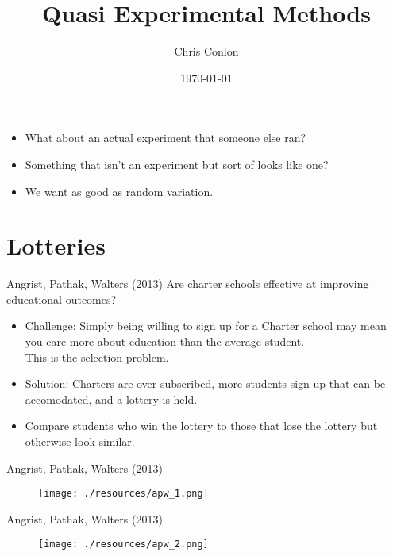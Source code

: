 

\title{Quasi Experimental Methods}
\author{Chris Conlon}
\date{\today}

\frame{\titlepage}


\begin{frame}{}
\begin{itemize}
\item What about an actual experiment that someone else ran?
\item Something that isn’t an experiment but sort of looks like one?
\item We want \alert{as good as random} variation.
\end{itemize}
\end{frame}
\section{Lotteries}

\begin{frame}{Angrist, Pathak, Walters (2013)}
Are charter schools effective at improving educational outcomes?
\begin{itemize}
    \item Challenge: Simply being willing to sign up for a Charter school may mean you care more about education than the average student.\\
    This is the \alert{selection problem}.
    \item Solution: Charters are over-subscribed, more students sign up that can be accomodated, and a lottery is held.
    \item Compare students who win the lottery to those that lose the lottery but otherwise look similar.
\end{itemize}
\end{frame}



\begin{frame}{Angrist, Pathak, Walters (2013)}
\begin{figure}
\centering
\texttt{[image: ./resources/apw\_1.png]}
\end{figure}
\end{frame}

\begin{frame}{Angrist, Pathak, Walters (2013)}
\begin{figure}
\centering
\texttt{[image: ./resources/apw\_2.png]}
\end{figure}
\end{frame}

